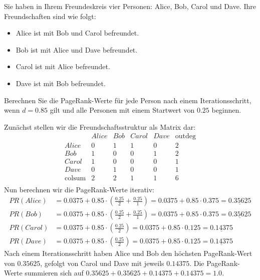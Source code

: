 \begin{myexercise}
    Sie haben in Ihrem Freundeskreis vier Personen: Alice, Bob, Carol und Dave. Ihre Freundschaften sind wie folgt:
    \begin{itemize}
        \item Alice ist mit Bob und Carol befreundet.
        \item Bob ist mit Alice und Dave befreundet.
        \item Carol ist mit Alice befreundet.
        \item Dave ist mit Bob befreundet.
    \end{itemize}
    Berechnen Sie die PageRank-Werte für jede Person nach einem Iterationsschritt, wenn $d=0.85$ gilt und alle Personen mit einem Startwert von $0.25$ beginnen.

    \begin{myanswer}
    Zunächst stellen wir die Freundschaftsstruktur als Matrix dar:
    \[
        \begin{array}{c|cccc|c}
                          & Alice & Bob & Carol & Dave & \text{outdeg} \\
            \hline
            Alice         & 0     & 1   & 1     & 0    & 2             \\
            Bob           & 1     & 0   & 0     & 1    & 2             \\
            Carol         & 1     & 0   & 0     & 0    & 1             \\
            Dave          & 0     & 1   & 0     & 0    & 1             \\
            \hline
            \text{colsum} & 2     & 2   & 1     & 1    & 6             \\
        \end{array}
    \]
    Nun berechnen wir die PageRank-Werte iterativ:
    \[
    \begin{aligned}
        PR(Alice) & = 0.0375 + 0.85 \cdot \left(\frac{0.25}{2} + \frac{0.25}{1}\right) = 0.0375 + 0.85 \cdot 0.375 = \underline{0.35625} \\
        PR(Bob)   & = 0.0375 + 0.85 \cdot \left(\frac{0.25}{2} + \frac{0.25}{1}\right) = 0.0375 + 0.85 \cdot 0.375 = \underline{0.35625} \\
        PR(Carol) & = 0.0375 + 0.85 \cdot \left(\frac{0.25}{2}\right) = 0.0375 + 0.85 \cdot 0.125 = \underline{0.14375} \\
        PR(Dave)  & = 0.0375 + 0.85 \cdot \left(\frac{0.25}{2}\right) = 0.0375 + 0.85 \cdot 0.125 = \underline{0.14375}
    \end{aligned}
    \]
    Nach einem Iterationsschritt haben Alice und Bob den höchsten PageRank-Wert von $0.35625$, gefolgt von Carol und Dave mit jeweils $0.14375$. Die PageRank-Werte summieren sich auf $0.35625 + 0.35625 + 0.14375 + 0.14375 = 1.0$.
    \end{myanswer}
\end{myexercise}

